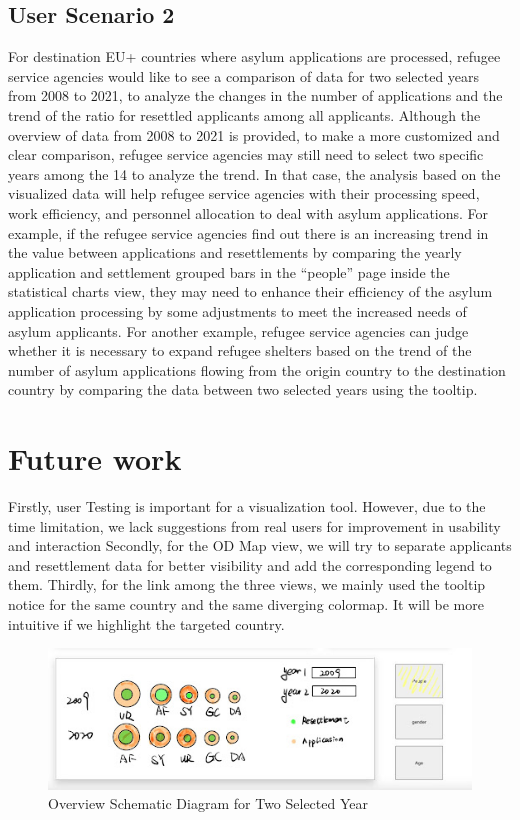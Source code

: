 \documentclass[journal]{vgtc}                %
\begin{document}
 \subsection{User Scenario 2}
 For destination EU+ countries where asylum applications are processed, refugee service agencies would like to see a comparison of data for two selected years from 2008 to 2021, to analyze the changes in the number of applications and the trend of the ratio for resettled applicants among all applicants. Although the overview of data from 2008 to 2021 is provided, to make a more customized and clear comparison, refugee service agencies may still need to select two specific years among the 14 to analyze the trend. In that case, the analysis based on the visualized data will help refugee service agencies with their processing speed, work efficiency, and personnel allocation to deal with asylum applications. For example, if the refugee service agencies find out there is an increasing trend in the value between applications and resettlements by comparing the yearly application and settlement grouped bars in the “people” page inside the statistical charts view, they may need to enhance their efficiency of the asylum application processing by some adjustments to meet the increased needs of asylum applicants. For another example, refugee service agencies can judge whether it is necessary to expand refugee shelters based on the trend of the number of asylum applications flowing from the origin country to the destination country by comparing the data between two selected years using the tooltip.
 \section{Future work}
 Firstly, user Testing is important for a visualization tool. However, due to the time limitation, we lack suggestions from real users for improvement in usability and interaction
 Secondly, for the OD Map view, we will try to separate applicants and resettlement data for better visibility and add the corresponding legend to them.
 Thirdly, for the link among the three views, we mainly used the tooltip notice for the same country and the same diverging colormap. It will be more intuitive if we highlight the targeted country.
 
\begin{figure}[tb]
  \centering %
  \includegraphics[width=\columnwidth]{fig5}
  \caption{Overview Schematic Diagram for Two Selected Year}
  \label{fig:us2-1}
 \end{figure}
\end{document}
